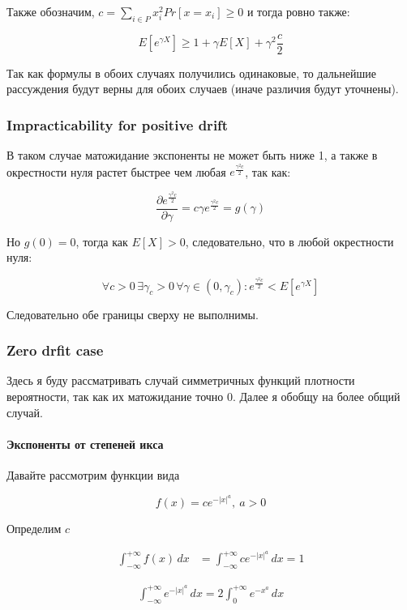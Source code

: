 \documentclass[12pt, a4paper]{article}
\theoremstyle{remark}
\newcommand{\expx}[1]{e^{-|x|^{#1}}}
\newcommand{\expxpoz}[1]{e^{-x^{#1}}}
\newcommand{\infint}[1]{\int_{-\infty}^{+\infty} #1 \, dx}
\newcommand{\infintpoz}[1]{\int_{0}^{+\infty} #1 \, dx}
\begin{document}
Также обозначим, $c = \sum_{i \in P} x_i^2 Pr[x = x_i] \geq 0$ и тогда ровно также: 

\[
E[e^{\gamma X}] \geq 1 + \gamma E[X] + \gamma^2 \frac{c}{2}  
\]

Так как формулы в обоих случаях получились одинаковые, то дальнейшие рассуждения будут верны для обоих случаев (иначе различия будут уточнены).

\subsubsection{Impracticability for positive drift}

В таком случае матожидание экспоненты не может быть ниже 1, а также в окрестности нуля растет быстрее чем любая $e^{\frac{\gamma^2 c }{2}}$, так как: 
        
$$\frac{\partial e^{\frac{\gamma^2 c}{2}}}{\partial \gamma} = c\gamma e^{\frac{\gamma^2 c}{2}} = g(\gamma)$$

Но $g(0) = 0$, тогда как $E[X] > 0$, следовательно, что в любой окрестности нуля:

$$\forall c > 0 \, \exists \gamma_c > 0 \, \forall \gamma \in (0, \gamma_c) : e^{\frac{\gamma^2 c}{2}} < E[e^{\gamma X}]$$

Следовательно обе границы сверху не выполнимы.

\subsubsection{Zero drfit case}
\label{sec:zero}

Здесь я буду рассматривать случай симметричных функций плотности вероятности, так как их матожидание точно 0. Далее я обобщу на более общий случай.

\paragraph*{Экспоненты от степеней икса}


Давайте рассмотрим функции вида

$$f(x) = c \expx{a},\ a > 0$$

Определим $c$

\begin{align*}
    \infint{f(x)} &= \infint{c\expx{a}} = 1
\end{align*}

\begin{align*}
    \infint{\expx{a}} = 2\infintpoz{\expxpoz{a}}
\end{align*}
\end{document}
